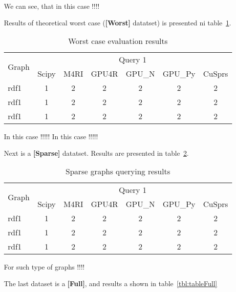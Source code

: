 We can see, that in this case !!!!


Results of theoretical worst case (\textbf{[Worst]} datatset) is presented ni table~\ref{tbl:tableWorst}.



\begin{table}[h]
\caption{Worst case evaluation results}
\label{tbl:tableWorst}
\begin{tabular}{| l | c | c | c | c | c | c | }
    \hline
    \multirow{2}{*}{Graph} & \multicolumn{6}{|c|}{Query 1} \\ 
    \cline{2-7}
                         & Scipy & M4RI & GPU4R & GPU\_N & GPU\_Py & CuSprs  \\
    \hline
    \hline
    rdf1 & 1 & 2 & 2& 2& 2& 2 \\ 
    rdf1 & 1 & 2 & 2& 2& 2& 2 \\ 
    rdf1 & 1 & 2 & 2& 2& 2& 2 \\ 
    \hline
  \end{tabular}
\end{table}


In this case !!!!!
In this case !!!!!

Next is a \textbf{[Sparse]} datatset. 
Results are presented in table~\ref{tbl:tableSparse}.

\begin{table}[h]
\caption{Sparse graphs querying results}
\label{tbl:tableSparse}
\begin{tabular}{| l | c | c | c | c | c | c | }
    \hline
    \multirow{2}{*}{Graph} & \multicolumn{6}{|c|}{Query 1} \\ 
    \cline{2-7}
                         & Scipy & M4RI & GPU4R & GPU\_N & GPU\_Py & CuSprs  \\
    \hline
    \hline
    rdf1 & 1 & 2 & 2& 2& 2& 2 \\ 
    rdf1 & 1 & 2 & 2& 2& 2& 2 \\ 
    rdf1 & 1 & 2 & 2& 2& 2& 2 \\ 
    \hline
  \end{tabular}
\end{table}


For such type of graphs !!!!

The last dataset is a \textbf{[Full]}, and results a shown in table~\ref{tbl:tableFull}


